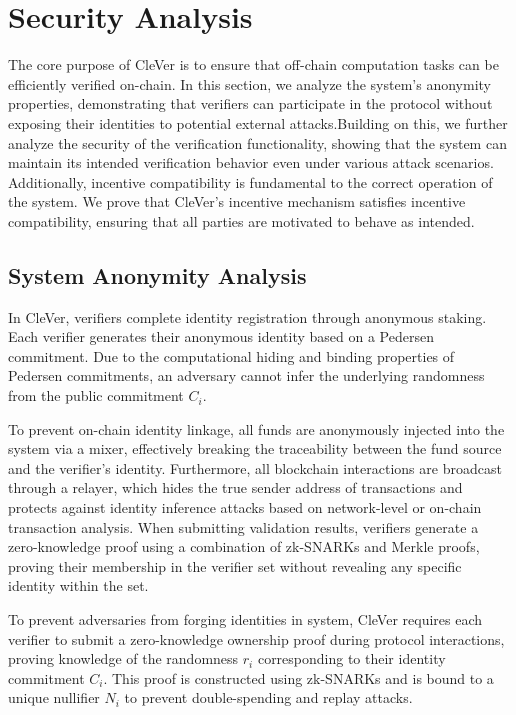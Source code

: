 \documentclass[3p]{elsarticle}
\theoremstyle{remark}
\begin{document}
\section{Security Analysis}

The core purpose of CleVer is to ensure that off-chain computation tasks can be efficiently verified on-chain. In this section, we analyze the system’s anonymity properties, demonstrating that verifiers can participate in the protocol without exposing their identities to potential external attacks.Building on this, we further analyze the security of the verification functionality, showing that the system can maintain its intended verification behavior even under various attack scenarios. Additionally, incentive compatibility is fundamental to the correct operation of the system. We prove that CleVer’s incentive mechanism satisfies incentive compatibility, ensuring that all parties are motivated to behave as intended.

\subsection{System Anonymity Analysis}

In CleVer, verifiers complete identity registration through anonymous staking. Each verifier generates their anonymous identity based on a Pedersen commitment. Due to the computational hiding and binding properties of Pedersen commitments, an adversary cannot infer the underlying randomness from the public commitment $C_i$.

To prevent on-chain identity linkage, all funds are anonymously injected into the system via a mixer, effectively breaking the traceability between the fund source and the verifier's identity. Furthermore, all blockchain interactions are broadcast through a relayer, which hides the true sender address of transactions and protects against identity inference attacks based on network-level or on-chain transaction analysis. When submitting validation results, verifiers generate a zero-knowledge proof using a combination of zk-SNARKs and Merkle proofs, proving their membership in the verifier set without revealing any specific identity within the set.

To prevent adversaries from forging identities in system, CleVer requires each verifier to submit a zero-knowledge ownership proof during protocol interactions, proving knowledge of the randomness $r_i$ corresponding to their identity commitment $C_i$. This proof is constructed using zk-SNARKs and is bound to a unique nullifier $N_i$ to prevent double-spending and replay attacks.
\end{document}
